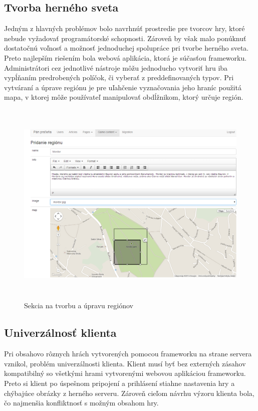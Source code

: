 \subsection{Tvorba herného sveta}
Jedným z hlavných problémov bolo navrhnúť prostredie pre tvorcov hry, ktoré nebude vyžadovať programátorské schopnosti. Zároveň by však malo ponúknuť dostatočnú voľnosť a možnosť jednoduchej spolupráce pri tvorbe herného sveta. Preto najlepším riešením bola webová aplikácia, ktorá je súčasťou frameworku. Administrátori cez jednotlivé nástroje môžu jednoducho vytvoriť hru iba vypĺňaním predrobených políčok, či vyberať z preddefinovaných typov. Pri vytváraní a úprave regiónu je pre uľahčenie vyznačovania jeho hraníc použitá mapa, v ktorej môže používateľ manipulovať obdĺžnikom, ktorý určuje región. 

\begin{figure}[h]
  \centering
  \includegraphics[height=10cm]{mainmatter/imgs/server_pridanieregionu.png}
  \caption{Sekcia na tvorbu a úpravu regiónov}
  \label{fig:server_tvorbaRegionu}
\end{figure}

\subsection{Univerzálnosť klienta}
Pri obsahovo rôznych hrách vytvorených pomocou frameworku na strane servera vznikol, problém univerzálnosti klienta. Klient musí byť bez externých zásahov kompatibilný so všetkými hrami vytvorenými webovou aplikáciou frameworku. Preto si klient po úspešnom pripojení a prihlásení stiahne nastavenia hry a chýbajúce obrázky z herného serveru. Zároveň cieľom návrhu výzoru klienta bola, čo najmenšia konfliktnosť s možným obsahom hry.

